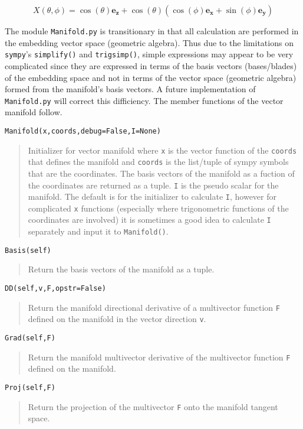 \documentclass[10pt]{article}
\newcommand{\lp}{\left (}
\newcommand{\rp}{\right )}
\newcommand{\f}[2]{{#1}\lp {#2} \rp}
\newcommand{\paren}[1]{\lp {#1} \rp}
\newcommand{\T}[1]{\texttt{#1}}
\begin{document}
     \begin{equation}
        \f{X}{\theta,\phi} = \f{\cos}{\theta}\bm{e_{z}}+\f{\cos}{\theta}\paren{\f{\cos}{\phi}\bm{e_{x}}+\f{\sin}{\phi}\bm{e_{y}}}
     \end{equation}

The module \T{Manifold.py} is transitionary in that all calculation are performed in the embedding vector space (geometric algebra).
Thus due to the limitations on \T{sympy}'s \T{simplify()} and  \T{trigsimp()}, simple expressions may appear to be very complicated since they are expressed
in terms of the basis vectors (bases/blades) of the embedding space and not in terms of the vector space (geometric algebra) formed
from the manifold's basis vectors.  A future implementation of \T{Manifold.py} will correct this difficiency. The member functions of
the vector manifold follow.

\T{Manifold(x,coords,debug=False,I=None)}
\begin{quote}
   Initializer for vector manifold where \T{x} is the vector function of the \T{coords} that defines the manifold and \T{coords} is the list/tuple
   of sympy symbols that are the coordinates.  The basis vectors of the manifold as a fuction of the coordinates are returned as a tuple. \T{I}
   is the pseudo scalar for the manifold.  The default is for the initializer to calculate \T{I}, however for complicated \T{x} functions (especially
   where trigonometric functions of the coordinates are involved) it is sometimes a good idea to calculate \T{I} separately and input it to \T{Manifold()}.
\end{quote}
\T{Basis(self)}
\begin{quote}
   Return the basis vectors of the manifold as a tuple.
\end{quote}
\T{DD(self,v,F,opstr=False)}
\begin{quote}
   Return the manifold directional derivative of a multivector function \T{F} defined on the manifold in the vector direction \T{v}.
\end{quote}
\T{Grad(self,F)}
\begin{quote}
   Return the manifold multivector derivative of the multivector function \T{F} defined on the manifold.
\end{quote}

\T{Proj(self,F)}
\begin{quote}
   Return the projection of the multivector \T{F} onto the manifold tangent space.
\end{quote}
\end{document}
